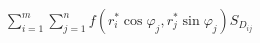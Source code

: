 \documentclass[preview]{standalone}
\begin{document}
\begin{align*}
\sum_{i=1}^m \sum_{j=1}^n f \left( r_i^* \cos \varphi_j, r_j^* \sin \varphi_j \right) S_{D_{ij}}
\end{align*}
\end{document}
